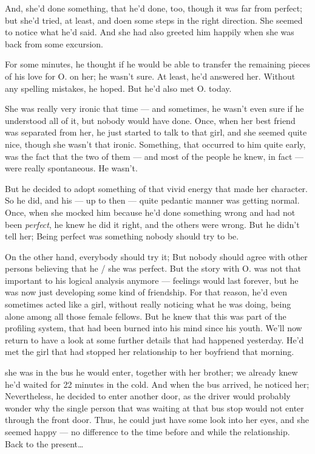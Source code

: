 And, she'd done something, that he'd done, too, though it was far from perfect; but she'd tried, at least, and doen some steps in the right direction. 
She seemed to notice what he'd said. 
And she had also greeted him happily when she was back from some excursion.

For some minutes, he thought if he would be able to transfer the remaining pieces of his love for O. on her; he wasn't sure. 
At least, he'd answered her. 
Without any spelling mistakes, he hoped. 
But he'd also met O. today.

She was really very ironic that time --- and sometimes, he wasn't even sure if he understood all of it, but nobody would have done. 
Once, when her best friend was separated from her, he just started to talk to that girl, and she seemed quite nice, though she wasn't that ironic. 
Something, that occurred to him quite early, was the fact that the two of them --- and most of the people he knew, in fact --- were really spontaneous. 
He wasn't.

But he decided to adopt something of that vivid energy that made her character. 
So he did, and his --- up to then --- quite pedantic manner was getting normal. 
Once, when she mocked him because he'd done something wrong and had not been \emph{perfect}, he knew he did it right, and the others were wrong. But he didn't tell her; Being perfect was something nobody should try to be.

On the other hand, everybody should try it; But nobody should agree with other persons believing that he / she was perfect. 
But the story with O. was not that important to his logical analysis anymore --- feelings would last forever, but he was now just developing some kind of friendship. 
For that reason, he'd even sometimes acted like a girl, without really noticing what he was doing, being alone among all those female fellows. 
But he knew that this was part of the profiling system, that had been burned into his mind since his youth. 
We'll now return to have a look at some further details that had happened yesterday. 
He'd met the girl that had stopped her relationship to her boyfriend that morning.

she was in the bus he would enter, together with her brother; we already knew he'd waited for 22 minutes in the cold. 
And when the bus arrived, he noticed her; Nevertheless, he decided to enter another door, as the driver would probably wonder why the single person that was waiting at that bus stop would not enter through the front door. 
Thus, he could just have some look into her eyes, and she seemed happy --- no difference to the time before and while the relationship.
Back to the present\ldots


